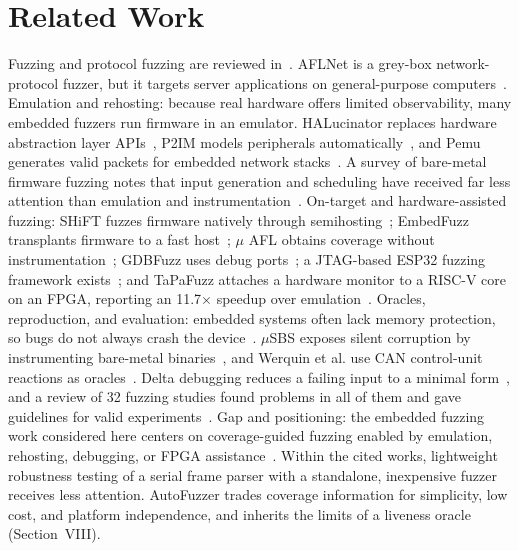 \documentclass[10pt,letterpaper]{article}
\begin{document}
\section{Related Work}
Fuzzing and protocol fuzzing are reviewed in~\cite{manes2021art,zhang2025survey}. AFLNet is a grey-box network-protocol fuzzer, but it targets server applications on general-purpose computers~\cite{pham2020aflnet}. Emulation and rehosting: because real hardware offers limited observability, many embedded fuzzers run firmware in an emulator. HALucinator replaces hardware abstraction layer APIs~\cite{clements2020halucinator}, P2IM models peripherals automatically~\cite{feng2020p2im}, and Pemu generates valid packets for embedded network stacks~\cite{mera2024emu}. A survey of bare-metal firmware fuzzing notes that input generation and scheduling have received far less attention than emulation and instrumentation~\cite{asmita2025}. On-target and hardware-assisted fuzzing: SHiFT fuzzes firmware natively through semihosting~\cite{mera2024shift}; EmbedFuzz transplants firmware to a fast host~\cite{hofhammer2024embedfuzz}; $\mu$ AFL obtains coverage without instrumentation~\cite{li2022muAFL}; GDBFuzz uses debug ports~\cite{eisele2023gdbfuzz}; a JTAG-based ESP32 fuzzing framework exists~\cite{borsig2020fuzzing}; and TaPaFuzz attaches a hardware monitor to a RISC-V core on an FPGA, reporting an 11.7$\times$ speedup over emulation~\cite{meisel2024tapafuzz}. Oracles, reproduction, and evaluation: embedded systems often lack memory protection, so bugs do not always crash the device~\cite{muench2018what}. $\mu$SBS exposes silent corruption by instrumenting bare-metal binaries~\cite{salehi2020ubs}, and Werquin et al. use CAN control-unit reactions as oracles~\cite{werquin2021}. Delta debugging reduces a failing input to a minimal form~\cite{zeller2002}, and a review of 32 fuzzing studies found problems in all of them and gave guidelines for valid experiments~\cite{klees2018evaluating}. Gap and positioning: the embedded fuzzing work considered here centers on coverage-guided fuzzing enabled by emulation, rehosting, debugging, or FPGA assistance~\cite{feng2020p2im,mera2024shift,li2022muAFL,eisele2023gdbfuzz,borsig2020fuzzing,meisel2024tapafuzz}. Within the cited works, lightweight robustness testing of a serial frame parser with a standalone, inexpensive fuzzer receives less attention. AutoFuzzer trades coverage information for simplicity, low cost, and platform independence, and inherits the limits of a liveness oracle (Section~VIII).
\end{document}
